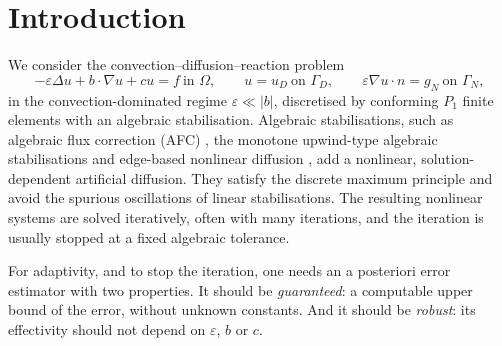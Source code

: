 \documentclass[11pt]{article}
\newcommand{\eps}{\varepsilon}
\theoremstyle{plain}
\theoremstyle{remark}
\numberwithin{equation}{section}
\begin{document}
\section{Introduction}\label{sec:intro}

We consider the convection--diffusion--reaction problem
\begin{equation}\label{eq:pde}
  -\eps\Delta u+b\cdot\nabla u+cu=f\ \text{in }\Omega,\qquad
  u=u_D\ \text{on }\Gamma_D,\qquad
  \eps\nabla u\cdot n=g_N\ \text{on }\Gamma_N,
\end{equation}
in the convection-dominated regime $\eps\ll|b|$, discretised by conforming $P_1$ finite elements with
an algebraic stabilisation. Algebraic stabilisations, such as algebraic flux correction (AFC)
\cite{BJK16,BJK17}, the monotone upwind-type algebraic stabilisations \cite{Kn23} and edge-based
nonlinear diffusion \cite{BBK17}, add a nonlinear, solution-dependent artificial diffusion. They
satisfy the discrete maximum principle and avoid the spurious oscillations of linear stabilisations.
The resulting nonlinear systems are solved iteratively, often with many iterations, and the
iteration is usually stopped at a fixed algebraic tolerance.

For adaptivity, and to stop the iteration, one needs an a posteriori error estimator with two
properties. It should be \emph{guaranteed}: a computable upper bound of the error, without unknown
constants. And it should be \emph{robust}: its effectivity should not depend on $\eps$, $b$ or $c$.
\end{document}
